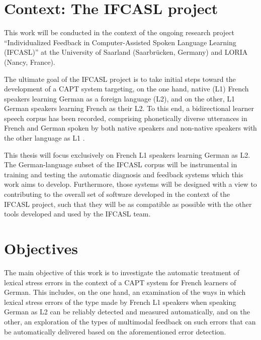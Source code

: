 \section{Context: The IFCASL project}
\label{sec:intro:ifcasl}

This work will be conducted in the context of the ongoing research project ``Individualized Feedback in Computer-Assisted Spoken Language Learning (IFCASL)'' at the University of Saarland (Saarbrücken, Germany) and LORIA (Nancy, France). 

The ultimate goal of the IFCASL project is to take initial steps toward the development of a CAPT system targeting, on the one hand, native (L1) French speakers learning German as a foreign language (L2), and on the other, L1 German speakers learning French as their L2. To this end, a bidirectional learner speech corpus has been recorded, comprising phonetically diverse utterances in French and German spoken by both native speakers and non-native speakers with the other language as L1 \citep{Fauth2014,Trouvain2013}.  

This thesis will focus exclusively on French L1 speakers learning German as L2. The German-language subset of the IFCASL corpus will be instrumental in training and testing the automatic diagnosis and feedback systems which this work aims to develop. Furthermore, those systems will be designed with a view to contributing to the overall set of software developed in the context of the IFCASL project, such that they will be as compatible as possible with the other tools developed and used by the IFCASL team. %


\section{Objectives}
\label{sec:intro:objectives}


The main objective of this work is to investigate the automatic treatment of lexical stress errors in the context of a CAPT system for French learners of German. This includes, on the one hand, an examination of the ways in which lexical stress errors of the type made by French L1 speakers when speaking German as L2 can be reliably detected and measured %
automatically, and on the other, an exploration of the types of multimodal feedback on such errors that can be automatically delivered based on the aforementioned error detection. 

